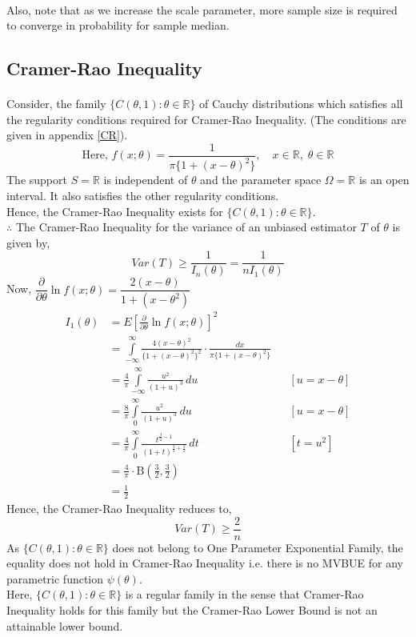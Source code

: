 \documentclass[12pt, fleqn, a4paper]{article}
\begin{document}
	\paragraph{} Also, note that as we increase the scale parameter, more sample size is required to converge in probability for sample median.

	\subsection{Cramer-Rao Inequality}
	\paragraph{} Consider, the family \(\{C(\theta,1):\theta\in \mathbb{R}\}\) of Cauchy distributions which satisfies all the regularity conditions required for Cramer-Rao Inequality. (The conditions are given in appendix \ref{CR}).
	$$ \text{Here, }f(x;\theta)=\frac{1}{\pi\{1+(x-\theta)^2\}} ,\quad x\in\mathbb{R},\;\theta\in\mathbb{R} $$ The support \(S=\mathbb{R}\) is independent of \(\theta\) and the parameter space \(\Omega=\mathbb{R}\) is an open interval. It also satisfies the other regularity conditions. \\
	Hence, the Cramer-Rao Inequality exists for \(\{C(\theta,1) :\theta\in\mathbb{R}\}\). \\ \(\therefore\) The Cramer-Rao Inequality for the variance of an unbiased estimator \(T\) of \(\theta\) is given by, $$ Var(T)\geq \frac{1}{I_n (\theta)}=\frac{1}{nI_1(\theta)} $$ 
	Now, \(\dfrac{\partial}{\partial\theta}\ln f(x;\theta)=\dfrac{2(x-\theta)}{1+(x-\theta^2)}\)
	\begin{align*}
		I_1(\theta)&=E\left[\frac{\partial}{\partial \theta}\ln f(x;\theta)\right]^2 \\
		&=\int\limits_{-\infty}^\infty\frac{4(x-\theta)^2} {\{1+(x-\theta)^2\}^2}\cdot \frac{dx}{\pi \{1+(x-\theta)^2\}} \\
		&=\frac{4}{\pi}\int\limits_{-\infty}^\infty\frac{u^2}{(1+u)^3}\,du && [u=x-\theta] \\
		&=\frac{8}{\pi}\int\limits_{0}^\infty\frac{u^2}{(1+u)^3}\,du && [u=x-\theta] \\
		&=\frac{4}{\pi}\int\limits_{0}^\infty\frac{t^{\frac{3}{2}-1}}{(1+t)^{\frac{3}{2}+\frac{3}{2}}}\,dt && [t=u^2]\\
		&=\frac{4}{\pi}\cdot\text{B}\left(\frac{3}{2},\frac{3}{2}\right) \\
		&=\frac{1}{2}
	\end{align*}
	Hence, the Cramer-Rao Inequality reduces to, $$ Var(T)\geq \frac{2}{n} $$ As \(\{C(\theta,1):\theta\in \mathbb{R}\}\) does not belong to One Parameter Exponential Family, the equality does not hold in Cramer-Rao Inequality i.e. there is no MVBUE for any parametric function \(\psi(\theta)\). \\
	Here, \(\{C(\theta,1):\theta\in \mathbb{R}\}\) is a regular family in the sense that Cramer-Rao Inequality holds for this family but the Cramer-Rao Lower Bound is not an attainable lower bound. 
	
\end{document}
